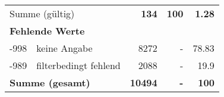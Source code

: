 \begin{longtable}{lXrrr}
     \midrule
     \multicolumn{2}{l}{Summe (gültig)} &
       \textbf{\num{134}} &
     \textbf{100} &
       \textbf{\num[round-mode=places,round-precision=2]{1,28}} \\
     \multicolumn{5}{l}{\textbf{Fehlende Werte}}\\
       -998 &
       keine Angabe &
         \num{8272} &
        - &
         \num[round-mode=places,round-precision=2]{78,83} \\
       -989 &
       filterbedingt fehlend &
         \num{2088} &
        - &
         \num[round-mode=places,round-precision=2]{19,9} \\
     \midrule
     \multicolumn{2}{l}{\textbf{Summe (gesamt)}} &
          \textbf{\num{10494}} &
        \textbf{-} &
        \textbf{100} \\
     \bottomrule
     \end{longtable}
     
